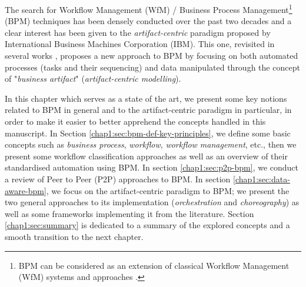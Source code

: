 The search for Workflow Management (WfM) / Business Process Management\footnote{BPM can be considered as an extension of classical Workflow Management (WfM) systems and approaches \cite{van2015business}.} (BPM) techniques has been densely conducted over the past two decades and a clear interest has been given to the \textit{artifact-centric} paradigm \cite{nigam2003business} proposed by International Business Machines Corporation (IBM). This one, revisited in several works \cite{abi2016towards, deutsch2014automatic, hull2009facilitating, lohmann2010artifact, assaf2017continuous, assaf2018generating, boaz2013bizartifact, lohmann2011artifact, estanol2012artifact}, proposes a new approach to BPM by focusing on both automated processes (tasks and their sequencing) and data manipulated through the concept of "\textit{business artifact}" (\textit{artifact-centric modelling}). 

In this chapter which serves as a state of the art, we present some key notions related to BPM in general and to the artifact-centric paradigm in particular, in order to make it easier to better apprehend the concepts handled in this manuscript. 
In Section \ref{chap1:sec:bpm-def-key-principles}, we define some basic concepts such as \textit{business process}, \textit{workflow}, \textit{workflow management}, etc., then we present some workflow classification approaches as well as an overview of their standardised automation using BPM. 
In section \ref{chap1:sec:p2p-bpm}, we conduct a review of Peer to Peer (P2P) approaches to BPM. 
In section \ref{chap1:sec:data-aware-bpm}, we focus on the artifact-centric paradigm to BPM; we present the two general approaches to its implementation (\textit{orchestration} and \textit{choreography}) as well as some frameworks implementing it from the literature. 
Section \ref{chap1:sec:summary} is dedicated to a summary of the explored concepts and a smooth transition to the next chapter.

